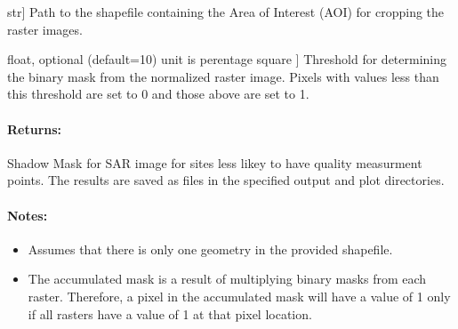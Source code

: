 \documentclass[letterpaper,10pt,english]{sphinxmanual}
\begin{document}
\begin{fulllineitems}
\begin{description}
\sphinxlineitem{shapefile\_path}{[}str{]}
\sphinxAtStartPar
Path to the shapefile containing the Area of Interest (AOI) for cropping the raster images.

\sphinxlineitem{scatter\_Area\_threshold}{[}float, optional (default=10) unit is perentage  square {]}
\sphinxAtStartPar
Threshold for determining the binary mask from the normalized raster image. Pixels with values 
less than this threshold are set to 0 and those above are set to 1.

\end{description}


\paragraph{Returns:}
\label{\detokenize{akhdefo_functions:id15}}
\sphinxAtStartPar
Shadow Mask for SAR image for sites less likey to have quality measurment points.
The results are saved as files in the specified output and plot directories.


\paragraph{Notes:}
\label{\detokenize{akhdefo_functions:notes}}\begin{itemize}
\item {} 
\sphinxAtStartPar
Assumes that there is only one geometry in the provided shapefile.

\item {} 
\sphinxAtStartPar
The accumulated mask is a result of multiplying binary masks from each raster. Therefore, a pixel in 
the accumulated mask will have a value of 1 only if all rasters have a value of 1 at that pixel location.

\end{itemize}

\end{fulllineitems}

\end{document}
